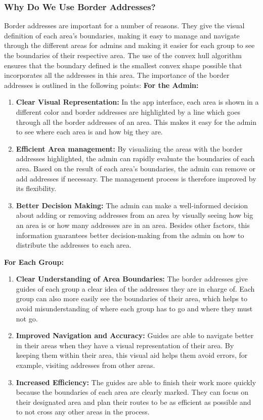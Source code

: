     \subsubsection{Why Do We Use Border Addresses?}
    Border addresses are important for a number of reasons. They give the visual definition of each area's boundaries, making it easy to manage and navigate through the different areas for admins and making it easier for each group to see the boundaries of their respective area. The use of the convex hull algorithm ensures that the boundary defined is the smallest convex shape possible that incorporates all the addresses in this area. The importance of the border addresses is outlined in the following points: \newline \newline
    \textbf{For the Admin:}
    \begin{enumerate}
        \item \textbf{Clear Visual Representation:} In the app interface, each area is shown in a different color and border addresses are highlighted by a line which goes through all the border addresses of an area. This makes it easy for the admin to see where each area is and how big they are.
        \item \textbf{Efficient Area management:} By visualizing the areas with the border addresses highlighted, the admin can rapidly evaluate the boundaries of each area. Based on the result of each area's boundaries, the admin can remove or add addresses if necessary. The management process is therefore improved by its flexibility. 
        \item \textbf{Better Decision Making:} The admin can make a well-informed decision about adding or removing addresses from an area by visually seeing how big an area is or how many addresses are in an area. Besides other factors, this information guarantees better decision-making from the admin on how to distribute the addresses to each area.
    \end{enumerate}

    \textbf{For Each Group:}
    \begin{enumerate}
        \item \textbf{Clear Understanding of Area Boundaries:} The border addresses give guides of each group a clear idea of the addresses they are in charge of. Each group can also more easily see the boundaries of their area, which helps to avoid misunderstanding of where each group has to go and where they must not go.
        \item \textbf{Improved Navigation and Accuracy:} Guides are able to navigate better in their areas when they have a visual representation of their area. By keeping them within their area, this visual aid helps them avoid errors, for example, visiting addresses from other areas. 
        \item \textbf{Increased Efficiency:} The guides are able to finish their work more quickly because the boundaries of each area are clearly marked. They can focus on their designated area and plan their routes to be as efficient as possible and to not cross any other areas in the process.
    \end{enumerate}

